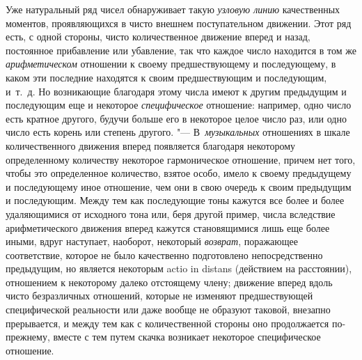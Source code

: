 Уже натуральный ряд чисел обнаруживает такую {\em узловую линию} качественных
моментов, проявляющихся в чисто внешнем поступательном движении. Этот ряд есть,
с одной стороны, чисто количественное движение вперед и назад, постоянное
прибавление или убавление, так что каждое число находится в том же
{\em арифметическом} отношении к своему предшествующему и последующему, в каком
эти последние находятся к своим предшествующим и последующим, и~т.~д. Но
возникающие благодаря этому числа имеют к другим предыдущим и последующим еще и
некоторое {\em специфическое} отношение: например, одно число есть кратное
другого, будучи больше его в некоторое целое число раз, или одно число есть
корень или степень другого. "--- В~{\em музыкальных} отношениях в шкале
количественного движения вперед появляется благодаря некоторому определенному
количеству некоторое гармоническое отношение, причем нет того, чтобы это
определенное количество, взятое особо, имело к своему предыдущему и
последующему иное отношение, чем они в свою очередь к своим предыдущим и
последующим. Между тем как последующие тоны кажутся все более и более
удаляющимися от исходного тона или, беря другой пример, числа вследствие
арифметического движения вперед кажутся становящимися лишь еще более иными,
вдруг наступает, наоборот, некоторый {\em возврат}, поражающее соответствие,
которое не было качественно подготовлено непосредственно предыдущим, но
является некоторым actio in distans (действием на расстоянии), отношением к
некоторому далеко отстоящему члену; движение вперед вдоль чисто безразличных
отношений, которые не изменяют предшествующей специфической реальности или даже
вообще не образуют таковой, внезапно прерывается, и между тем как с
количественной стороны оно продолжается по-прежнему, вместе с тем путем скачка
возникает некоторое специфическое отношение.

